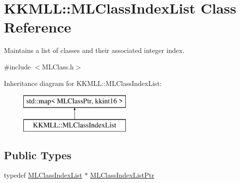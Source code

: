 \hypertarget{class_k_k_m_l_l_1_1_m_l_class_index_list}{}\section{K\+K\+M\+LL\+:\+:M\+L\+Class\+Index\+List Class Reference}
\label{class_k_k_m_l_l_1_1_m_l_class_index_list}


Maintains a list of classes and their associated integer index.  




{\ttfamily \#include $<$M\+L\+Class.\+h$>$}

Inheritance diagram for K\+K\+M\+LL\+:\+:M\+L\+Class\+Index\+List\+:\begin{figure}[H]
\begin{center}
\leavevmode
\includegraphics[height=2.000000cm]{class_k_k_m_l_l_1_1_m_l_class_index_list}
\end{center}
\end{figure}
\subsection*{Public Types}
\begin{DoxyCompactItemize}
\item 
typedef \hyperlink{class_k_k_m_l_l_1_1_m_l_class_index_list}{M\+L\+Class\+Index\+List} $\ast$ \hyperlink{class_k_k_m_l_l_1_1_m_l_class_index_list_a13e67cfd849602c0ba70ec10043f6b05}{M\+L\+Class\+Index\+List\+Ptr}
\end{DoxyCompactItemize}
